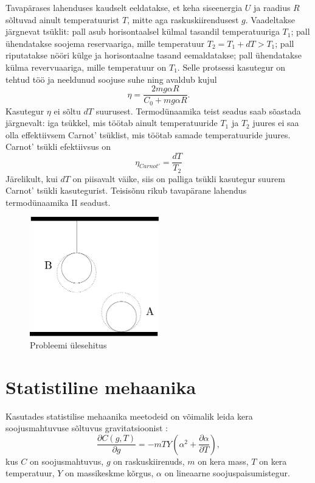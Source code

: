 \documentclass{trkut}%
\begin{document}
Tavapärases lahenduses kaudselt eeldatakse, et keha siseenergia \(U\) ja raadius \(R\) sõltuvad ainult temperatuurist \(T\), mitte aga raskuskiirendusest \(g\). Vaadeltakse järgnevat tsüklit: pall asub horisontaalsel külmal tasandil temperatuuriga \(T_1\); pall ühendatakse soojema reservaariga, mille temperatuur \(T_2=T_1+dT>T_1\); pall riputatakse nööri külge ja horisontaalne tasand eemaldatakse; pall ühendatakse külma revervuaariga, mille temperatuur on \(T_1\). Selle protsessi kasutegur on tehtud töö ja neeldunud soojuse suhe ning avaldub kujul \cite{palma15}
\begin{equation}
    \eta = \frac{2mg\alpha R}{C_0+mg\alpha R}.
\end{equation}
Kasutegur \(\eta\) ei sõltu \(dT\) suurusest. Termodünaamika teist seadus saab sõastada järgnevalt: iga tsükkel, mis töötab ainult temperatuuride \(T_1\) ja \(T_2\) juures ei saa olla effektiivsem Carnot' tsüklist, mis töötab samade temperatuuride juures. Carnot' tsükli efektiivsus on
\begin{equation}
    \eta_{Carnot'} = \frac{dT}{T_2}
\end{equation}
Järelikult, kui \(dT\) on piisavalt väike, siis on palliga tsükli kasutegur suurem Carnot' tsükli kasutegurist. Teisisõnu rikub tavapärane lahendus termodünaamika II seadust.
\begin{figure}[h]
    \includegraphics[width=0.5\textwidth]{joonis1.pdf}
    \caption{Probleemi ülesehitus}
    \label{iphojoonis}%
\end{figure}

\section{Statistiline mehaanika}

Kasutades statistilise mehaanika meetodeid on võimalik leida kera soojusmahtuvuse sõltuvus gravitatsioonist \parencite[test]{palma15}:
\begin{equation}
    \frac{\partial C(g,T)}{\partial g} = -mTY \left( \alpha^2 + \frac{\partial \alpha}{\partial T} \right),
\end{equation}
kus \(C\) on soojusmahtuvus, \(g\) on raskuskiirenuds, \(m\) on kera mass, \(T\) on kera temperatuur, \(Y\) on massikeskme kõrgus, \(\alpha\) on lineaarne soojuspaisumistegur.
\end{document}
